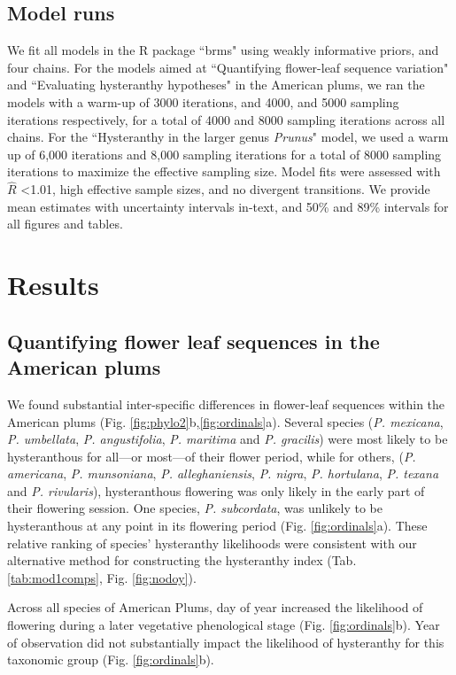 \documentclass{article}[12pt]
\begin{document}
{\subsection*{Model runs} 
We fit all models in the R package ``brms" \citep{Burkner2018} using weakly informative priors, and four chains.
For the models aimed at ``Quantifying flower-leaf sequence variation" and ``Evaluating hysteranthy hypotheses" in the American plums, we ran the models with a warm-up of 3000 iterations, and 4000, and 5000 sampling iterations respectively, for a total of 4000 and 8000 sampling iterations across all chains. For the ``Hysteranthy in the larger genus \textit{Prunus}" model, we used a warm up of 6,000 iterations and 8,000 sampling iterations for a total of 8000 sampling iterations to maximize the effective sampling size. Model fits were assessed with  $\hat{R}$ <1.01, high effective sample sizes, and no divergent transitions. We provide mean estimates with  uncertainty intervals in-text, and 50\% and 89\% intervals for all figures and tables.

\section*{Results}
\subsection*{Quantifying flower leaf sequences in the American plums}
We found substantial inter-specific differences in flower-leaf sequences within the American plums (Fig. \ref{fig:phylo2}b,\ref{fig:ordinals}a). Several species (\emph{P. mexicana}, \textit{P. umbellata}, \textit{P. angustifolia}, \textit{P. maritima} and \textit{P. gracilis}) were most likely to be hysteranthous for all---or most---of their flower period, while for others, (\textit{P. americana}, \textit{P. munsoniana}, \textit{P. alleghaniensis}, \textit{P. nigra}, \textit{P. hortulana}, \textit{P. texana} and \textit{P. rivularis}), hysteranthous flowering was only likely in the early part of their flowering session. One species, \emph{P. subcordata}, was unlikely to be hysteranthous at any point in its flowering period (Fig. \ref{fig:ordinals}a). These relative ranking of species' hysteranthy likelihoods were consistent with our alternative method for constructing the hysteranthy index (Tab. \ref{tab:mod1comps}, Fig. \ref{fig:nodoy}).


Across all species of American Plums, day of year increased the likelihood of flowering during a later vegetative phenological stage (Fig. \ref{fig:ordinals}b). Year of observation did not substantially impact the likelihood of hysteranthy for this taxonomic group (Fig. \ref{fig:ordinals}b).

}
\end{document}
